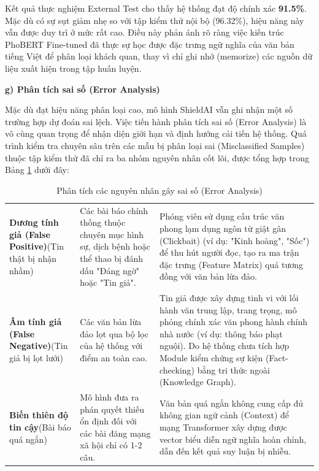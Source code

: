 \documentclass[12pt,a4paper]{article}
\begin{document}
Kết quả thực nghiệm External Test cho thấy hệ thống đạt độ chính xác \textbf{91.5\%}. Mặc dù có sự sụt giảm nhẹ so với tập kiểm thử nội bộ (96.32\%), hiệu năng này vẫn được duy trì ở mức rất cao. Điều này phản ánh rõ ràng việc kiến trúc PhoBERT Fine-tuned đã thực sự học được đặc trưng ngữ nghĩa của văn bản tiếng Việt để phân loại khách quan, thay vì chỉ ghi nhớ (memorize) các nguồn dữ liệu xuất hiện trong tập huấn luyện.

\textbf{g) Phân tích sai số (Error Analysis)}

Mặc dù đạt hiệu năng phân loại cao, mô hình ShieldAI vẫn ghi nhận một số trường hợp dự đoán sai lệch. Việc tiến hành phân tích sai số (Error Analysis) là vô cùng quan trọng để nhận diện giới hạn và định hướng cải tiến hệ thống. Quá trình kiểm tra chuyên sâu trên các mẫu bị phân loại sai (Misclassified Samples) thuộc tập kiểm thử đã chỉ ra ba nhóm nguyên nhân cốt lõi, được tổng hợp trong Bảng \ref{tab:error_analysis} dưới đây:

\begin{table}[H]
\centering
\small
\caption{Phân tích các nguyên nhân gây sai số (Error Analysis)}
\label{tab:error_analysis}
\begin{tabularx}{\textwidth}{|>{\raggedright\arraybackslash}p{3.5cm}|>{\raggedright\arraybackslash}p{4cm}|>{\raggedright\arraybackslash}X|}
\hline
\multicolumn{1}{|c|}{\textbf{Trường hợp sai số}} & \multicolumn{1}{c|}{\textbf{Hiện tượng quan sát}} & \multicolumn{1}{c|}{\textbf{Nguyên nhân cốt lõi}} \\
\hline
\textbf{Dương tính giả (False Positive)}\newline (Tin thật bị nhận nhầm) & Các bài báo chính thống thuộc chuyên mục hình sự, dịch bệnh hoặc thể thao bị đánh dấu "Đáng ngờ" hoặc "Tin giả". & Phóng viên sử dụng cấu trúc văn phong lạm dụng ngôn từ giật gân (Clickbait) (ví dụ: "Kinh hoàng", "Sốc") để thu hút người đọc, tạo ra ma trận đặc trưng (Feature Matrix) quá tương đồng với văn bản lừa đảo. \\
\hline
\textbf{Âm tính giả (False Negative)}\newline (Tin giả bị lọt lưới) & Các văn bản lừa đảo lọt qua bộ lọc của hệ thống với điểm an toàn cao. & Tin giả được xây dựng tinh vi với lối hành văn trung lập, trang trọng, mô phỏng chính xác văn phong hành chính nhà nước (ví dụ: thông báo phạt nguội). Do hệ thống chưa tích hợp Module kiểm chứng sự kiện (Fact-checking) bằng tri thức ngoài (Knowledge Graph). \\
\hline
\textbf{Biến thiên độ tin cậy}\newline (Bài báo quá ngắn) & Mô hình đưa ra phán quyết thiếu ổn định đối với các bài đăng mạng xã hội chỉ có 1-2 câu. & Văn bản quá ngắn không cung cấp đủ không gian ngữ cảnh (Context) để mạng Transformer xây dựng được vector biểu diễn ngữ nghĩa hoàn chỉnh, dẫn đến kết quả suy luận bị nhiễu. \\
\hline
\end{tabularx}
\end{table}
\end{document}
